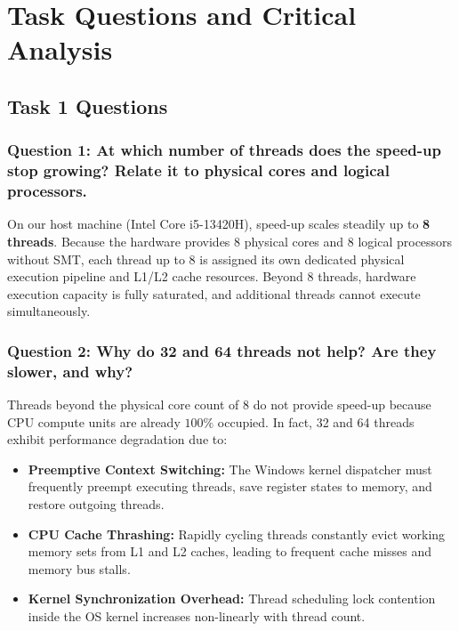 \documentclass[12pt,a4paper]{article}
\begin{document}
\section{Task Questions and Critical Analysis}

\subsection{Task 1 Questions}

\subsubsection{Question 1: At which number of threads does the speed-up stop growing? Relate it to physical cores and logical processors.}
On our host machine (Intel Core i5-13420H), speed-up scales steadily up to \textbf{8 threads}. Because the hardware provides 8 physical cores and 8 logical processors without SMT, each thread up to 8 is assigned its own dedicated physical execution pipeline and L1/L2 cache resources. Beyond 8 threads, hardware execution capacity is fully saturated, and additional threads cannot execute simultaneously.

\subsubsection{Question 2: Why do 32 and 64 threads not help? Are they slower, and why?}
Threads beyond the physical core count of 8 do not provide speed-up because CPU compute units are already $100\%$ occupied. In fact, 32 and 64 threads exhibit performance degradation due to:
\begin{itemize}
    \item \textbf{Preemptive Context Switching:} The Windows kernel dispatcher must frequently preempt executing threads, save register states to memory, and restore outgoing threads.
    \item \textbf{CPU Cache Thrashing:} Rapidly cycling threads constantly evict working memory sets from L1 and L2 caches, leading to frequent cache misses and memory bus stalls.
    \item \textbf{Kernel Synchronization Overhead:} Thread scheduling lock contention inside the OS kernel increases non-linearly with thread count.
\end{itemize}
\end{document}
